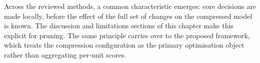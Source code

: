 Across the reviewed methods, a common characteristic emerges: core decisions are made locally, before the effect of the full set of changes on the compressed model is known. The discussion and limitations sections of this chapter make this explicit for pruning. The same principle carries over to the proposed framework, which treats the compression configuration as the primary optimisation object rather than aggregating per-unit scores.

